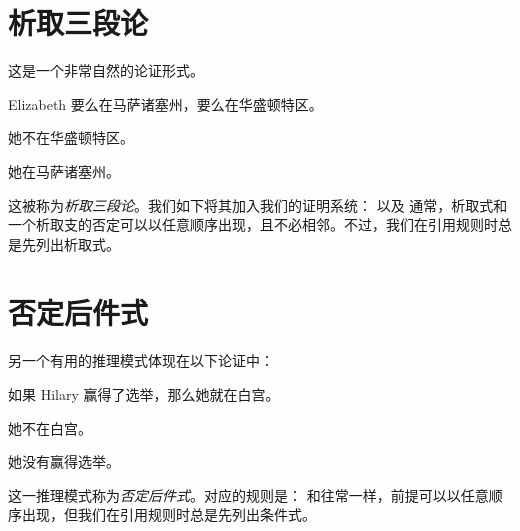 \section{析取三段论}
这是一个非常自然的论证形式。

\begin{earg}
		\item Elizabeth 要么在马萨诸塞州，要么在华盛顿特区。
		\item 她不在华盛顿特区。
		\item[\texttherefore] 她在马萨诸塞州。
	\end{earg}

这被称为\emph{析取三段论}。我们如下将其加入我们的证明系统：
以及
通常，析取式和一个析取支的否定可以以任意顺序出现，且不必相邻。不过，我们在引用规则时总是先列出析取式。

\section{否定后件式}
另一个有用的推理模式体现在以下论证中：

\begin{earg}
		\item 如果 Hilary 赢得了选举，那么她就在白宫。
		\item 她不在白宫。
		\item[\texttherefore] 她没有赢得选举。
	\end{earg}

这一推理模式称为\emph{否定后件式}。对应的规则是：
和往常一样，前提可以以任意顺序出现，但我们在引用规则时总是先列出条件式。

